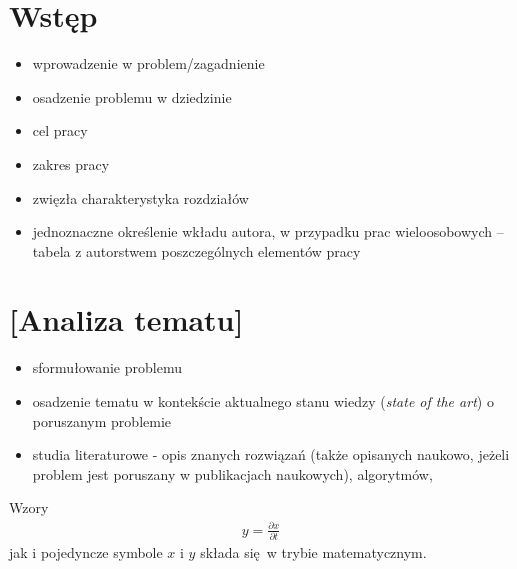 \documentclass[a4paper,twoside,12pt]{book}
\newcommand{\obcy}[1]{\emph{#1}}
\newcommand{\english}[1]{{\selectlanguage{british}\obcy{#1}}}
\newcounter{stronyPozaNumeracja}
\begin{document}
\tableofcontents

\setcounter{stronyPozaNumeracja}{\value{page}}
\mainmatter
\pagestyle{empty}

\cleardoublepage

\pagestyle{NumeryStronNazwyRozdzialow}


\chapter{Wstęp}
\label{ch:wstep}

\begin{itemize}
	\item wprowadzenie w problem/zagadnienie
	\item osadzenie problemu w dziedzinie
	\item cel pracy
	\item zakres pracy
	\item zwięzła charakterystyka rozdziałów
	\item jednoznaczne określenie wkładu autora, w przypadku prac wieloosobowych – tabela z autorstwem poszczególnych elementów pracy
\end{itemize}



\chapter{[Analiza tematu]}

\begin{itemize}
	\item sformułowanie problemu
	\item osadzenie tematu w kontekście aktualnego stanu wiedzy (\english{state of the art}) o poruszanym problemie
	\item  studia literaturowe \cite{bib:artykul,bib:ksiazka,bib:konferencja,bib:internet} -  opis znanych rozwiązań (także opisanych naukowo, jeżeli problem jest poruszany w publikacjach naukowych), algorytmów,
\end{itemize}


Wzory
\begin{align}
	y = \frac{\partial x}{\partial t}
\end{align}
jak i pojedyncze symbole $x$ i $y$  składa się w trybie matematycznym.
\end{document}
